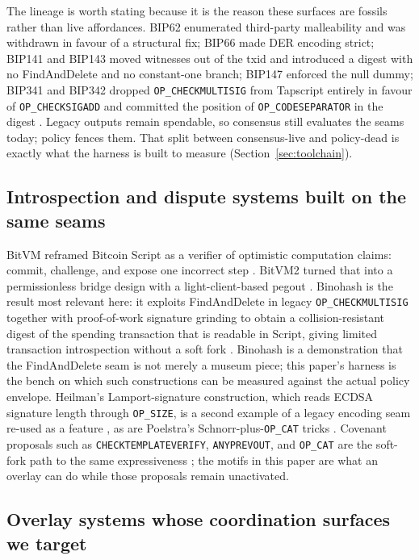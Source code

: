 \documentclass[11pt]{article}
\begin{document}
The lineage is worth stating because it is the reason these surfaces are
fossils rather than live affordances. BIP62 enumerated third-party malleability
and was withdrawn in favour of a structural fix; BIP66 made DER encoding strict;
BIP141 and BIP143 moved witnesses out of the txid and introduced a digest with
no FindAndDelete and no constant-one branch; BIP147 enforced the null dummy;
BIP341 and BIP342 dropped \texttt{OP\_CHECKMULTISIG} from Tapscript entirely in
favour of \texttt{OP\_CHECKSIGADD} and committed the position of
\texttt{OP\_CODESEPARATOR} in the digest
\cite{bip62,bip66,bip141,bip143,bip147,bip341,bip342}. Legacy outputs remain
spendable, so consensus still evaluates the seams today; policy fences them. That
split between consensus-live and policy-dead is exactly what the harness is
built to measure (Section~\ref{sec:toolchain}).

\subsection{Introspection and dispute systems built on the same seams}

BitVM reframed Bitcoin Script as a verifier of optimistic computation claims:
commit, challenge, and expose one incorrect step \cite{linus2023bitvm}. BitVM2
turned that into a permissionless bridge design with a light-client-based
pegout \cite{linus2025bitvm2}. Binohash is the result most relevant here: it
exploits FindAndDelete in legacy \texttt{OP\_CHECKMULTISIG} together with
proof-of-work signature grinding to obtain a collision-resistant digest of the
spending transaction that is readable in Script, giving limited transaction
introspection without a soft fork \cite{linus2026binohash}. Binohash is a
demonstration that the FindAndDelete seam is not merely a museum piece; this
paper's harness is the bench on which such constructions can be measured
against the actual policy envelope. Heilman's Lamport-signature construction,
which reads ECDSA signature length through \texttt{OP\_SIZE}, is a second
example of a legacy encoding seam re-used as a feature \cite{heilman2024lamport},
as are Poelstra's Schnorr-plus-\texttt{OP\_CAT} tricks \cite{poelstra2021cat}.
Covenant proposals such as \texttt{CHECKTEMPLATEVERIFY}, \texttt{ANYPREVOUT},
and \texttt{OP\_CAT} are the soft-fork path to the same expressiveness
\cite{bip119,bip118,bip347,moser2016covenants}; the motifs in this paper are what
an overlay can do while those proposals remain unactivated.

\subsection{Overlay systems whose coordination surfaces we target}
\end{document}
